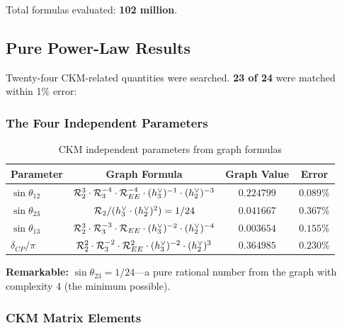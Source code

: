 Total formulas evaluated: \textbf{102 million}.

\subsection{Pure Power-Law Results}\label{sec:ckm_pure}

Twenty-four CKM-related quantities were searched. \textbf{23 of 24} were matched within 1\% error:

\subsubsection{The Four Independent Parameters}

\begin{table}[h]
\centering
\caption{CKM independent parameters from graph formulas}
\label{tab:ckm_independent}
\begin{tabular}{lccc}
\hline\hline
Parameter & Graph Formula & Graph Value & Error \\
\hline
$\sin\theta_{12}$ & $\mathcal{R}_2^3 \cdot \mathcal{R}_3^{-4} \cdot \mathcal{R}_{EE}^{-4} \cdot (h^\vee_3)^{-1} \cdot (h^\vee_2)^{-3}$ & $0.224799$ & $0.089\%$ \\
$\sin\theta_{23}$ & $\mathcal{R}_2 / (h^\vee_3 \cdot (h^\vee_2)^2) = 1/24$ & $0.041667$ & $0.367\%$ \\
$\sin\theta_{13}$ & $\mathcal{R}_2^3 \cdot \mathcal{R}_3^{-3} \cdot \mathcal{R}_{EE} \cdot (h^\vee_3)^{-2} \cdot (h^\vee_2)^{-4}$ & $0.003654$ & $0.155\%$ \\
$\delta_{CP}/\pi$ & $\mathcal{R}_2^2 \cdot \mathcal{R}_3^{-2} \cdot \mathcal{R}_{EE}^2 \cdot (h^\vee_3)^{-2} \cdot (h^\vee_2)^3$ & $0.364985$ & $0.230\%$ \\
\hline\hline
\end{tabular}
\end{table}

\textbf{Remarkable:} $\sin\theta_{23} = 1/24$---a pure rational number from the graph with complexity 4 (the minimum possible).

\subsubsection{CKM Matrix Elements}

